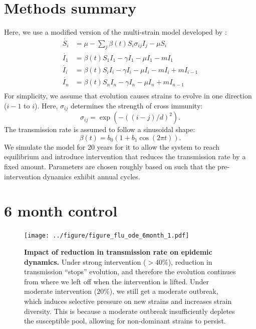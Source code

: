 \documentclass[12pt]{article}
\date{\today}
\begin{document}
\begin{flushleft}{
	\Large
	\textbf{}
}
\newline
\\
\end{flushleft} 

\tableofcontents

\pagebreak

\section{Methods summary}

Here, we use a modified version of the multi-strain model developed by \cite{gog2002dynamics}:
\begin{align}
\dot{S_i} &= \mu - \sum_j \beta(t) S_i \sigma_{ij} I_j - \mu S_i\\
\dot{I_1} &= \beta(t) S_1 I_1 - \gamma I_1 - \mu I_1 - m I_1\\
\dot{I_i} &= \beta(t) S_i I_i - \gamma I_i - \mu I_i - m I_i + mI_{i-1}\\
\dot{I_n} &= \beta(t) S_n I_n - \gamma I_n - \mu I_n + mI_{n-1}\\
\end{align}
For simplicity, we assume that evolution causes strains to evolve in one direction ($i-1$ to $i$).
Here, $\sigma_{ij}$ determines the strength of cross immunity:
\begin{equation}
\sigma_{ij} = \exp\left(-((i-j)/d)^2\right).
\end{equation}
The transmission rate is assumed to follow a sinusoidal shape:
\begin{equation}
\beta(t) = b_0 (1 + b_1 \cos(2 \pi t)).
\end{equation}
We simulate the model for 20 years for it to allow the system to reach equilibrium and introduce intervention that reduces the transmission rate by a fixed amount.
Parameters are chosen roughly based on \cite{gog2002dynamics} such that the pre-intervention dynamics exhibit annual cycles.

\pagebreak

\section{6 month control}

\begin{figure}[!h]
\texttt{[image: ../figure/figure\_flu\_ode\_6month\_1.pdf]}
\caption{
\textbf{Impact of reduction in transmission rate on epidemic dynamics.}
Under strong intervention ($>40\%$), reduction in transmission ``stops'' evolution, and therefore the evolution continues from where we left off when the intervention is lifted.
Under moderate intervention ($20\%$), we still get a moderate outbreak, which induces selective pressure on new strains and increases strain diversity.
This is because a moderate outbreak insufficiently depletes the susceptible pool, allowing for non-dominant strains to persist.
}
\end{figure}
\end{document}
